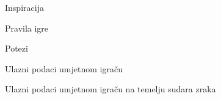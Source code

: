   \begin{frame}{Inspiracija}
  \end{frame}

  \begin{frame}{Pravila igre}
  \end{frame}

  \begin{frame}{Potezi}
  \end{frame}

  \begin{frame}{Ulazni podaci umjetnom igraču}
  \end{frame}

  \begin{frame}{Ulazni podaci umjetnom igraču na temelju sudara zraka}
  \end{frame}
